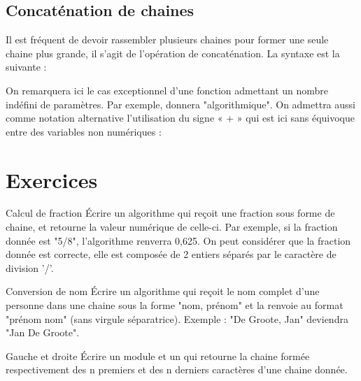 		\subsection{Concaténation de chaines}

			Il est fréquent de devoir rassembler plusieurs chaines 
			pour former une seule chaine plus grande, 
			il s'agit de l'opération de concaténation. 
			La syntaxe est la suivante :
	
			\begin{center}
			\end{center}
			
			On remarquera ici le cas exceptionnel 
			d'une fonction admettant un nombre indéfini de paramètres. 
			Par exemple, 
			donnera "algorithmique". 
			On admettra aussi comme notation alternative 
			l'utilisation du signe « + » 
			qui est ici sans équivoque 
			entre des variables non numériques :

			\begin{center}
			\end{center}

\section{Exercices}

\begin{Exercice}{Calcul de fraction}
	Écrire un algorithme 
	qui reçoit une fraction sous forme de chaine, 
	et retourne la valeur numérique de celle-ci. 
	Par exemple, si la fraction donnée est "5/8", 
	l'algorithme renverra 0,625. 
	On peut considérer que la fraction donnée est correcte, 
	elle est composée de 2 entiers séparés 
	par le caractère de division '/'.
\end{Exercice}

\begin{Exercice}{Conversion de nom}
	Écrire un algorithme 
	qui reçoit le nom complet d'une personne 
	dans une chaine sous la forme "nom, prénom" 
	et la renvoie au format "prénom nom" 
	(sans virgule séparatrice). 
	Exemple : "De Groote, Jan" deviendra "Jan De Groote".	
\end{Exercice}

\begin{Exercice}{Gauche et droite}
	Écrire un module  
	et un 
	qui retourne la chaine formée respectivement 
	des n premiers et des n derniers caractères d'une chaine donnée.	
\end{Exercice}


